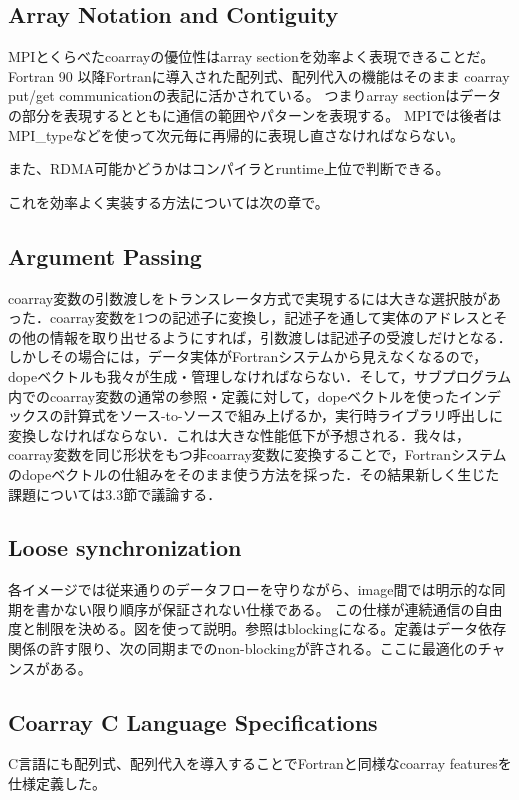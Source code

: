 \subsection{Array Notation and Contiguity}
MPIとくらべたcoarrayの優位性はarray sectionを効率よく表現できることだ。
Fortran 90 以降Fortranに導入された配列式、配列代入の機能はそのまま
coarray put/get communicationの表記に活かされている。
つまりarray sectionはデータの部分を表現するとともに通信の範囲やパターンを表現する。
MPIでは後者はMPI\_typeなどを使って次元毎に再帰的に表現し直さなければならない。

また、RDMA可能かどうかはコンパイラとruntime上位で判断できる。

これを効率よく実装する方法については次の章で。


\subsection{Argument Passing}
coarray変数の引数渡しをトランスレータ方式で実現するには大きな選択肢があった．coarray変数を1つの記述子に変換し，記述子を通して実体のアドレスとその他の情報を取り出せるようにすれば，引数渡しは記述子の受渡しだけとなる．しかしその場合には，データ実体がFortranシステムから見えなくなるので，dopeベクトルも我々が生成・管理しなければならない．そして，サブプログラム内でのcoarray変数の通常の参照・定義に対して，dopeベクトルを使ったインデックスの計算式をソース-to-ソースで組み上げるか，実行時ライブラリ呼出しに変換しなければならない．これは大きな性能低下が予想される．我々は，coarray変数を同じ形状をもつ非coarray変数に変換することで，Fortranシステムのdopeベクトルの仕組みをそのまま使う方法を採った．その結果新しく生じた課題については3.3節で議論する．


\subsection{Loose synchronization}
各イメージでは従来通りのデータフローを守りながら、image間では明示的な同期を書かない限り順序が保証されない仕様である。
この仕様が連続通信の自由度と制限を決める。図を使って説明。参照はblockingになる。定義はデータ依存関係の許す限り、次の同期までのnon-blockingが許される。ここに最適化のチャンスがある。


\subsection{Coarray C Language Specifications}

C言語にも配列式、配列代入を導入することでFortranと同様なcoarray featuresを仕様定義した。

